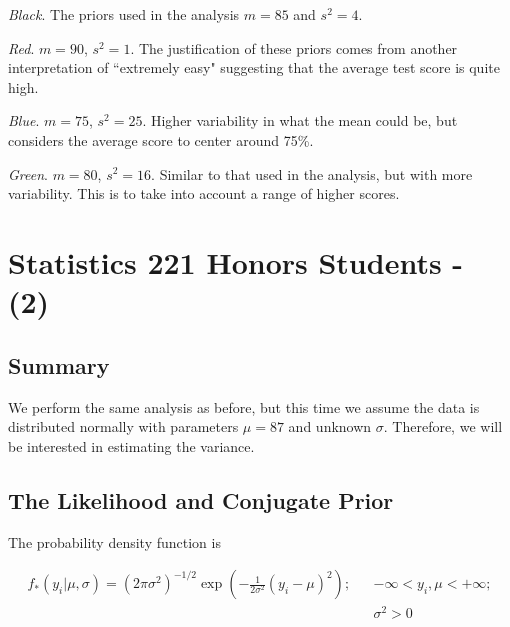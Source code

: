 \documentclass[12pt]{article}
\begin{document}
\noindent \emph{Black}.  The priors used in the analysis $m=85$ and $s^2=4$.

\noindent \emph{Red}. $m=90$, $s^2=1$.  The justification of these priors comes from another interpretation of ``extremely easy" suggesting that the average test score is quite high.

\noindent \emph{Blue}. $m=75$, $s^2=25$.  Higher variability in what the mean could be, but considers the average score to center around 75\%.

\noindent \emph{Green}. $m=80$, $s^2=16$.  Similar to that used in the analysis, but with more variability.  This is to take into account a range of higher scores.

%

\newpage

\section{Statistics 221 Honors Students - (2)}

\subsection{Summary}

\noindent We perform the same analysis as before, but this time we assume the data is distributed normally with parameters $\mu=87$ and unknown $\sigma$.  Therefore, we will be interested in estimating the variance.

\subsection{The Likelihood and Conjugate Prior}

\noindent The probability density function is

\begin{eqnarray*}
f_*(y_i|\mu,\sigma)=(2\pi\sigma^2)^{-1/2}\exp\left(-\frac{1}{2\sigma^2}(y_i-\mu)^2\right); && -\infty<y_i,\mu<+\infty; \\
&& \sigma^2>0 \\
\end{eqnarray*}
\end{document}
